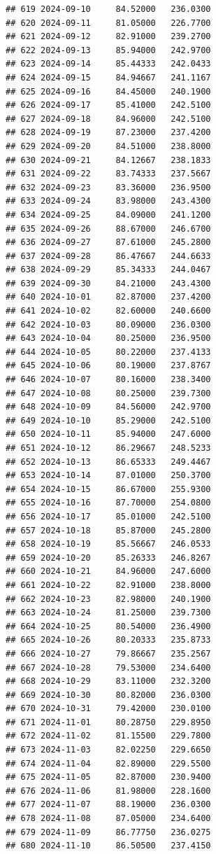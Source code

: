\documentclass[
]{article}
\begin{document}
\begin{verbatim}
## 619 2024-09-10     84.52000   236.0300
## 620 2024-09-11     81.05000   226.7700
## 621 2024-09-12     82.91000   239.2700
## 622 2024-09-13     85.94000   242.9700
## 623 2024-09-14     85.44333   242.0433
## 624 2024-09-15     84.94667   241.1167
## 625 2024-09-16     84.45000   240.1900
## 626 2024-09-17     85.41000   242.5100
## 627 2024-09-18     84.96000   242.5100
## 628 2024-09-19     87.23000   237.4200
## 629 2024-09-20     84.51000   238.8000
## 630 2024-09-21     84.12667   238.1833
## 631 2024-09-22     83.74333   237.5667
## 632 2024-09-23     83.36000   236.9500
## 633 2024-09-24     83.98000   243.4300
## 634 2024-09-25     84.09000   241.1200
## 635 2024-09-26     88.67000   246.6700
## 636 2024-09-27     87.61000   245.2800
## 637 2024-09-28     86.47667   244.6633
## 638 2024-09-29     85.34333   244.0467
## 639 2024-09-30     84.21000   243.4300
## 640 2024-10-01     82.87000   237.4200
## 641 2024-10-02     82.60000   240.6600
## 642 2024-10-03     80.09000   236.0300
## 643 2024-10-04     80.25000   236.9500
## 644 2024-10-05     80.22000   237.4133
## 645 2024-10-06     80.19000   237.8767
## 646 2024-10-07     80.16000   238.3400
## 647 2024-10-08     80.25000   239.7300
## 648 2024-10-09     84.56000   242.9700
## 649 2024-10-10     85.29000   242.5100
## 650 2024-10-11     85.94000   247.6000
## 651 2024-10-12     86.29667   248.5233
## 652 2024-10-13     86.65333   249.4467
## 653 2024-10-14     87.01000   250.3700
## 654 2024-10-15     86.67000   255.9300
## 655 2024-10-16     87.70000   254.0800
## 656 2024-10-17     85.01000   242.5100
## 657 2024-10-18     85.87000   245.2800
## 658 2024-10-19     85.56667   246.0533
## 659 2024-10-20     85.26333   246.8267
## 660 2024-10-21     84.96000   247.6000
## 661 2024-10-22     82.91000   238.8000
## 662 2024-10-23     82.98000   240.1900
## 663 2024-10-24     81.25000   239.7300
## 664 2024-10-25     80.54000   236.4900
## 665 2024-10-26     80.20333   235.8733
## 666 2024-10-27     79.86667   235.2567
## 667 2024-10-28     79.53000   234.6400
## 668 2024-10-29     83.11000   232.3200
## 669 2024-10-30     80.82000   236.0300
## 670 2024-10-31     79.42000   230.0100
## 671 2024-11-01     80.28750   229.8950
## 672 2024-11-02     81.15500   229.7800
## 673 2024-11-03     82.02250   229.6650
## 674 2024-11-04     82.89000   229.5500
## 675 2024-11-05     82.87000   230.9400
## 676 2024-11-06     81.98000   228.1600
## 677 2024-11-07     88.19000   236.0300
## 678 2024-11-08     87.05000   234.6400
## 679 2024-11-09     86.77750   236.0275
## 680 2024-11-10     86.50500   237.4150

\end{verbatim}
\end{document}
